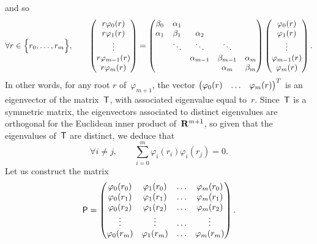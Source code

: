 and so
\[
    \forall r \in \Bigl\{ r_0, \dotsc, r_m \Bigr\}, \qquad
    \begin{pmatrix}
        r \varphi_0(r) \\
        r \varphi_1(r) \\
        \vdots \\
        r \varphi_{m-1}(r) \\
        r \varphi_m(r)
    \end{pmatrix}
    =
    \begin{pmatrix}
        \beta_0 & \alpha_1 \\
        \alpha_1 & \beta_1 & \alpha_2 \\
                 & \ddots & \ddots & \ddots \\
                 & & \alpha_{m-1} & \beta_{m-1} & \alpha_m \\
                 & & & \alpha_m & \beta_m
    \end{pmatrix}
    \begin{pmatrix}
        \varphi_0(r) \\
        \varphi_1(r) \\
        \vdots \\
        \varphi_{m-1}(r) \\
        \varphi_m(r)
    \end{pmatrix}.
\]
In other words,
for any root $r$ of~$\varphi_{m+1}$,
the vector $\begin{pmatrix} \varphi_0(r) & \hdots & \varphi_m(r) \end{pmatrix}^T$
is an eigenvector of the matrix~$\mathsf T$,
with associated eigenvalue equal to~$r$.
Since~$\mathsf T$ is a symmetric matrix,
the eigenvectors associated to distinct eigenvalues are orthogonal for the Euclidean inner product of~$\mathbf R^{m+1}$,
so given that the eigenvalues of~$\mathsf T$ are distinct,
we deduce that
\begin{equation}
    \label{eq:orthogonality}
    \forall i \neq j, \qquad
    \sum_{i=0}^{m} \varphi_i(r_i) \varphi_i(r_j) = 0.
\end{equation}
Let us construct the matrix
\[
    \mathsf P =
    \begin{pmatrix}
        \varphi_0(r_0) & \varphi_1(r_0) & \hdots & \varphi_m(r_0) \\
        \varphi_0(r_1) & \varphi_1(r_1) & \hdots & \varphi_m(r_1) \\
        \varphi_0(r_2) & \varphi_1(r_2) & \hdots & \varphi_m(r_2) \\
        \vdots & \vdots & \hdots & \vdots \\
        \varphi_0(r_m) & \varphi_1(r_m) & \hdots & \varphi_m(r_m)
    \end{pmatrix}.
\]
